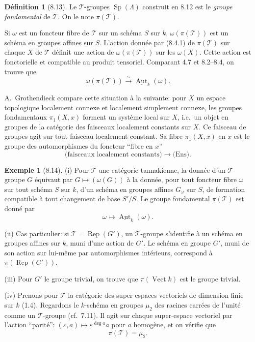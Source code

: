 \documentclass[12pt,a4paper]{article}
\theoremstyle{plain}
\theoremstyle{definition}
\newtheorem{definition}[theorem]{Définition}
\newtheorem{example}[theorem]{Exemple}
\DeclareMathOperator{\Sp}{Sp}
\DeclareMathOperator{\Aut}{Aut}
\DeclareMathOperator{\Rep}{Rep}
\DeclareMathOperator{\Vect}{Vect}
\begin{document}
\begin{definition}[8.13]
Le $\mathcal{T}$-groupes $\Sp(\Lambda)$ construit en 8.12 est le \emph{groupe fondamental} de $\mathcal{T}$. On le note $\pi(\mathcal{T})$.
\end{definition}

Si $\omega$ est un foncteur fibre de $\mathcal{T}$ sur un schéma $S$ sur $k$, $\omega(\pi(\mathcal{T}))$ est un schéma en groupes affines sur $S$. L'action donnée par (8.4.1) de $\pi(\mathcal{T})$ sur chaque $X$ de $\mathcal{T}$ définit une action de $\omega(\pi(\mathcal{T}))$ sur les $\omega(X)$. Cette action est fonctorielle et compatible au produit tensoriel. Comparant 4.7 et 8.2--8.4, on trouve que
\begin{equation}\label{eq:8.13.1}
\omega(\pi(\mathcal{T})) \xrightarrow{\sim} \underline{\Aut}_k(\omega).
\end{equation}

A.~Grothendieck compare cette situation à la suivante: pour $X$ un espace topologique localement connexe et localement simplement connexe, les groupes fondamentaux $\pi_1(X, x)$ forment un système local sur $X$, i.e.~un objet en groupes de la catégorie des faisceaux localement constants sur $X$. Ce faisceau de groupes agit sur tout faisceau localement constant. Sa fibre $\pi_1(X, x)$ en $x$ est le groupe des automorphismes du foncteur ``fibre en $x$''
\[
\text{(faisceaux localement constants)} \to \text{(Ens)}.
\]

\begin{example}[8.14]
\textup{(i)} Pour $\mathcal{T}$ une catégorie tannakienne, la donnée d'un $\mathcal{T}$-groupe $G$ équivaut par $G \mapsto (\omega(G))$ à la donnée, pour tout foncteur fibre $\omega$ sur tout schéma $S$ sur $k$, d'un schéma en groupes affines $G_\omega$ sur $S$, de formation compatible à tout changement de base $S'/S$. Le groupe fondamental $\pi(\mathcal{T})$ est donné par
\[
\omega \mapsto \underline{\Aut}_k(\omega).
\]

\textup{(ii)} Cas particulier: si $\mathcal{T} = \Rep(G')$, un $\mathcal{T}$-groupe s'identifie à un schéma en groupes affines sur $k$, muni d'une action de $G'$. Le schéma en groupe $G'$, muni de son action sur lui-même par automorphismes intérieurs, correspond à $\pi(\Rep(G'))$.

\textup{(iii)} Pour $G'$ le groupe trivial, on trouve que $\pi(\Vect k)$ est le groupe trivial.

\textup{(iv)} Prenons pour $\mathcal{T}$ la catégorie des super-espaces vectoriels de dimension finie sur $k$ (1.4). Regardons le $k$-schéma en groupes $\mu_2$ des racines carrées de l'unité comme un $\mathcal{T}$-groupe (cf.~7.11). Il agit sur chaque super-espace vectoriel par l'action ``parité'': $(\varepsilon, a) \mapsto \varepsilon^{\deg a} a$ pour $a$ homogène, et on vérifie que
\[
\pi(\mathcal{T}) = \mu_2.
\]
\end{example}
\end{document}
